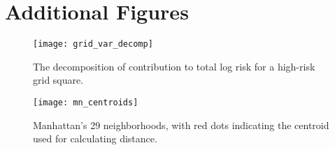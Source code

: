 \clearpage
\label{AppendixA}
\vspace{-1.75cm}
\section{Additional Figures}


\begin{figure}[h!]
  \centering
  \caption{The decomposition of contribution to total log risk for a high-risk grid square.}
  \texttt{[image: grid\_var\_decomp]}
\end{figure}


 \begin{figure}[h!]
   \centering
     \texttt{[image: mn\_centroids]}
     \caption{Manhattan's 29 neighborhoods, with red dots indicating the centroid used for calculating distance.}
\end{figure}
